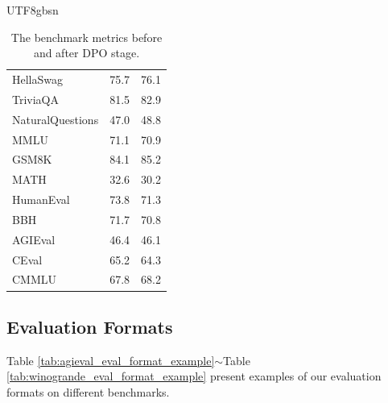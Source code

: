 \documentclass[11pt, a4paper, logo, copyright, nonumbering]{deepseek}
\begin{document}
\begin{CJK*}{UTF8}{gbsn}
\begin{table}[h]
\begin{tabular}{lcc}
HellaSwag & 75.7 & 76.1 \\

TriviaQA & 81.5 & 82.9 \\

NaturalQuestions & 47.0 & 48.8 \\

MMLU & 71.1 & 70.9 \\

GSM8K & 84.1 & 85.2 \\

MATH & 32.6 & 30.2 \\

HumanEval & 73.8 & 71.3 \\

BBH & 71.7 & 70.8 \\

AGIEval & 46.4 & 46.1 \\

CEval & 65.2 & 64.3 \\

CMMLU & 67.8 & 68.2 \\
\bottomrule
\end{tabular}
    \caption{\centering The benchmark metrics before and after DPO stage. }
    \label{tab: dpo}
\end{table}

\subsection{Evaluation Formats}
\label{appendix:eval_formats}
Table \ref{tab:agieval_eval_format_example}$\sim$Table \ref{tab:winogrande_eval_format_example} present examples of our evaluation formats on different benchmarks.


\setcounter{figure}{0}
\makeatletter 
\renewcommand{\thefigure}{A\@arabic\c@figure}
\makeatother

\setcounter{table}{0}
\makeatletter 
\renewcommand{\thetable}{A\@arabic\c@table}
\makeatother

\end{CJK*}
\end{document}
